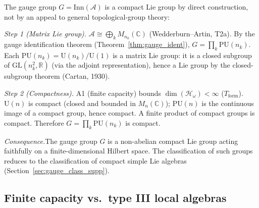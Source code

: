 \documentclass[11pt,a4paper]{article}
\theoremstyle{definition}
\begin{document}
\noindent The gauge group $G = \mathrm{Inn}(\mathcal{A})$ is a compact
Lie group by direct construction, not by an appeal to general
topological-group theory:

\smallskip\noindent\textit{Step 1 (Matrix Lie group).}\quad
$\mathcal{A} \cong \bigoplus_k M_{n_k}(\mathbb{C})$ (Wedderburn--Artin,
T2a).  By the gauge identification theorem
(Theorem~\ref{thm:gauge_ident}),
$G = \prod_k \mathrm{PU}(n_k)$.  Each $\mathrm{PU}(n_k) =
\mathrm{U}(n_k) / \mathrm{U}(1)$ is a matrix Lie group: it is a
closed subgroup of $\mathrm{GL}(n_k^2, \mathbb{R})$ (via the adjoint
representation), hence a Lie group by the closed-subgroup theorem
(Cartan, 1930).

\smallskip\noindent\textit{Step 2 (Compactness).}\quad
A1 (finite capacity) bounds $\dim(\mathcal{H}_\omega) < \infty$
($T_{\mathrm{form}}$).  $\mathrm{U}(n)$ is compact (closed and bounded
in $M_n(\mathbb{C})$); $\mathrm{PU}(n)$ is the continuous image of a
compact group, hence compact.  A finite product of compact groups is
compact.  Therefore $G = \prod_k \mathrm{PU}(n_k)$ is compact.

\smallskip\noindent\textit{Consequence.}\quad The gauge group $G$ is a
non-abelian compact Lie group acting faithfully on a finite-dimensional
Hilbert space.  The classification of such groups reduces to the
classification of compact simple Lie algebras (Section~\ref{sec:gauge_class_supp}).


\subsection{Finite capacity vs.\ type III local algebras}
\label{sec:finite_vs_typeIII}
\end{document}

